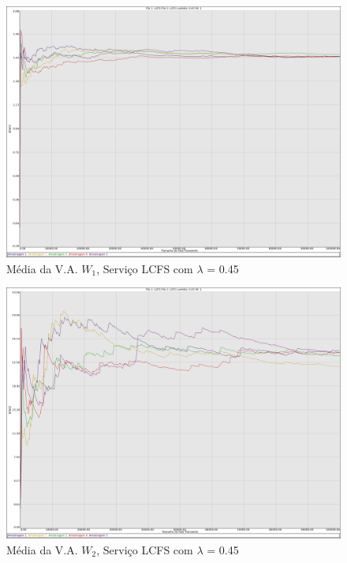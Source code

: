 \documentclass[a4paper,10pt]{article}
\begin{document}
\begin{figure}
	\caption{Média da V.A. $W_1$, Serviço LCFS com $\lambda$ = 0.45}
	\label{figTransienteLCFSfila1W}
	\includegraphics[scale = 0.20]{./graficos_transiente_1/LCFS/07.png}
\end{figure}

\begin{figure}
	\caption{Média da V.A. $W_2$, Serviço LCFS com $\lambda$ = 0.45}
	\label{figTransienteLCFSfila2W}
	\includegraphics[scale = 0.20]{./graficos_transiente_1/LCFS/08.png}
\end{figure}
\end{document}
